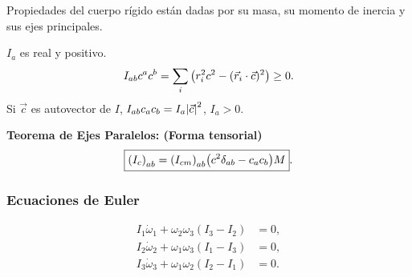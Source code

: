 \begin{tcolorbox}
	Propiedades del cuerpo rígido están dadas por su masa, su momento de inercia y sus ejes principales.
\end{tcolorbox}

$I_a$ es real y positivo.
\begin{equation}
	I_{ab} c^a c^b = \sum _i \qty(r_i ^2 c^2 - (\vec{r}_i \cdot \vec{c})^2) \geq 0.
\end{equation}
Si $\vec{c}$ es autovector de $I$, $I_{ab} c_a c_b = I_a \abs{\vec{c}}^2$, $I_a > 0$.

\begin{teorema}
	\textbf{Teorema de Ejes Paralelos: (Forma tensorial)}
	\begin{equation}
		\boxed{ \qty(I_c)_{ab} = \qty(I_{cm})_{ab} \qty(c^2 \delta _{ab} - c_a c_b)M }.
	\end{equation}
\end{teorema}


\subsubsection{Ecuaciones de Euler}
\begin{align*}
	I_1 \dot{\omega}_1 + \omega _2 \omega _3 (I_3 - I_2) &= 0, \\
	I_2 \dot{\omega}_2 + \omega _1 \omega _3 (I_1 - I_3) &= 0, \\
	I_3 \dot{\omega}_3 + \omega _1 \omega _2 (I_2 - I_1) &= 0.
\end{align*}



















































































